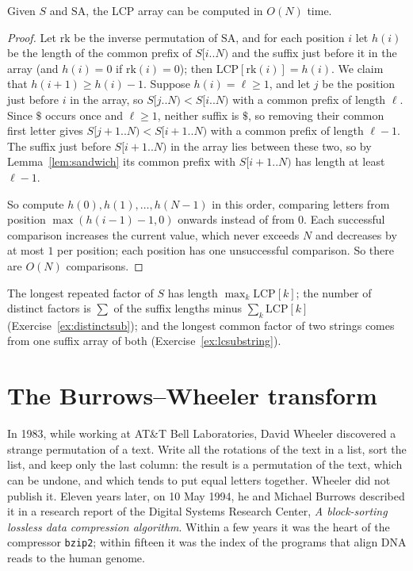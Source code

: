 \begin{theorem}\label{thm:kasai}
Given $S$ and $\mathrm{SA}$, the LCP array can be computed in $O(N)$ time.
\end{theorem}
\begin{proof}
Let $\mathrm{rk}$ be the inverse permutation of $\mathrm{SA}$, and for each position $i$ let $h(i)$ be the length of the common prefix of $S[i..N)$ and the suffix just before it in the array (and $h(i)=0$ if $\mathrm{rk}(i)=0$); then $\mathrm{LCP}[\mathrm{rk}(i)]=h(i)$. We claim that $h(i+1)\ge h(i)-1$. Suppose $h(i)=\ell\ge1$, and let $j$ be the position just before $i$ in the array, so $S[j..N)<S[i..N)$ with a common prefix of length $\ell$.
Since $\$$ occurs once and $\ell\ge1$, neither suffix is $\$$, so removing their common first letter gives $S[j+1..N)<S[i+1..N)$ with a common prefix of length $\ell-1$. The suffix just before $S[i+1..N)$ in the array lies between these two, so by Lemma~\ref{lem:sandwich} its common prefix with $S[i+1..N)$ has length at least $\ell-1$.

So compute $h(0),h(1),\dots,h(N-1)$ in this order, comparing letters from position $\max(h(i-1)-1,0)$ onwards instead of from $0$. Each successful comparison increases the current value, which never exceeds $N$ and decreases by at most $1$ per position; each position has one unsuccessful comparison. So there are $O(N)$ comparisons.
\end{proof}

The longest repeated factor of $S$ has length $\max_k\mathrm{LCP}[k]$; the number of distinct factors is $\sum$ of the suffix lengths minus $\sum_k\mathrm{LCP}[k]$ (Exercise~\ref{ex:distinctsub}); and the longest common factor of two strings comes from one suffix array of both (Exercise~\ref{ex:lcsubstring}).

\section{The Burrows--Wheeler transform}\label{sec:bwt}

In 1983, while working at AT\&T Bell Laboratories, David Wheeler discovered a strange permutation of a text. Write all the rotations of the text in a list, sort the list, and keep only the last column: the result is a permutation of the text, which can be undone, and which tends to put equal letters together. Wheeler did not publish it. Eleven years later, on 10 May 1994, he and Michael Burrows described it in a research report of the Digital Systems Research Center, \emph{A block-sorting lossless data compression algorithm}. Within a few years it was the heart of the compressor \texttt{bzip2}; within fifteen it was the index of the programs that align DNA reads to the human genome.

